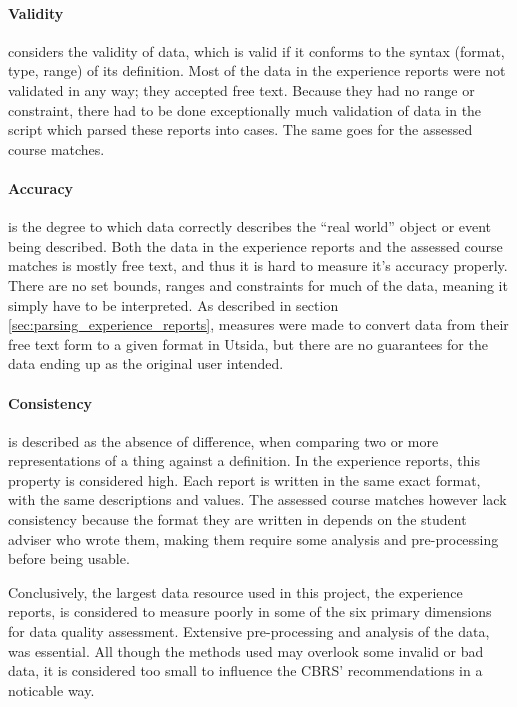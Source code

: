 \paragraph{Validity} considers the validity of data, which is valid if it conforms to the syntax (format, type, range) of its definition\cite{askham2013six}. Most of the data in the experience reports were not validated in any way; they accepted free text. Because they had no range or constraint, there had to be done exceptionally much validation of data in the script which parsed these reports into cases. The same goes for the assessed course matches.

\paragraph{Accuracy} is the degree to which data correctly describes the \enquote{real world} object or event being described\cite{askham2013six}. Both the data in the experience reports and the assessed course matches is mostly free text, and thus it is hard to measure it's accuracy properly. There are no set bounds, ranges and constraints for much of the data, meaning it simply have to be interpreted. As described in section \ref{sec:parsing_experience_reports}, measures were made to convert data from their free text form to a given format in Utsida, but there are no guarantees for the data ending up as the original user intended.

\paragraph{Consistency} is described as the absence of difference, when comparing two or more representations of a thing against a definition\cite{askham2013six}. In the experience reports, this property is considered high. Each report is written in the same exact format, with the same descriptions and values. The assessed course matches however lack consistency because the format they are written in depends on the student adviser who wrote them, making them require some analysis and pre-processing before being usable. 

Conclusively, the largest data resource used in this project, the experience reports, is considered to measure poorly in some of the six primary dimensions for data quality assessment. Extensive pre-processing and analysis of the data, was essential. All though the methods used may overlook some invalid or bad data, it is considered too small to influence the CBRS' recommendations in a noticable way. 


